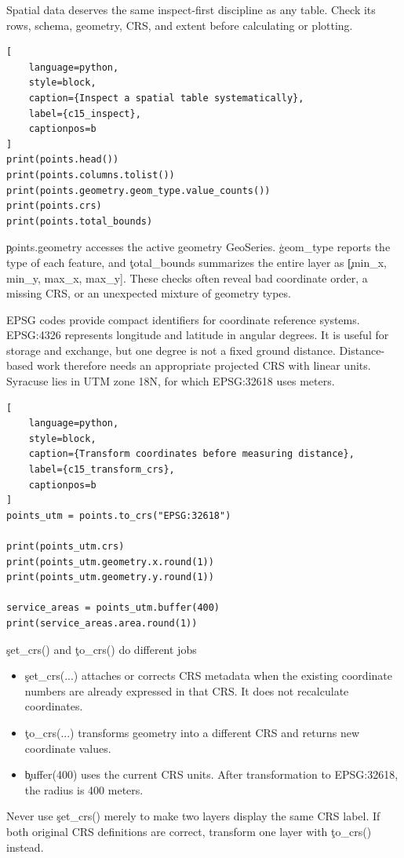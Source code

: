 
Spatial data deserves the same inspect-first discipline as any table. Check
its rows, schema, geometry, CRS, and extent before calculating or plotting.

\begin{lstlisting}[
    language=python,
    style=block,
    caption={Inspect a spatial table systematically},
    label={c15_inspect},
    captionpos=b
]
print(points.head())
print(points.columns.tolist())
print(points.geometry.geom_type.value_counts())
print(points.crs)
print(points.total_bounds)
\end{lstlisting}

\c{points.geometry} accesses the active geometry GeoSeries.
\c{geom_type} reports the type of each feature, and \c{total_bounds} summarizes
the entire layer as \c{[min_x, min_y, max_x, max_y]}. These checks often reveal
bad coordinate order, a missing CRS, or an unexpected mixture of geometry types.


EPSG codes provide compact identifiers for coordinate reference systems.
EPSG:4326 represents longitude and latitude in angular degrees. It is useful
for storage and exchange, but one degree is not a fixed ground distance.
Distance-based work therefore needs an appropriate projected CRS with linear
units. Syracuse lies in UTM zone 18N, for which EPSG:32618 uses meters.

\begin{lstlisting}[
    language=python,
    style=block,
    caption={Transform coordinates before measuring distance},
    label={c15_transform_crs},
    captionpos=b
]
points_utm = points.to_crs("EPSG:32618")

print(points_utm.crs)
print(points_utm.geometry.x.round(1))
print(points_utm.geometry.y.round(1))

service_areas = points_utm.buffer(400)
print(service_areas.area.round(1))
\end{lstlisting}

\begin{SyntaxBox}{\c{set_crs()} and \c{to_crs()} do different jobs}
\begin{itemize}
    \item \c{set_crs(...)} attaches or corrects CRS metadata when the existing
          coordinate numbers are already expressed in that CRS. It does not
          recalculate coordinates.
    \item \c{to_crs(...)} transforms geometry into a different CRS and returns
          new coordinate values.
    \item \c{buffer(400)} uses the current CRS units. After transformation to
          EPSG:32618, the radius is 400 meters.
\end{itemize}
Never use \c{set_crs()} merely to make two layers display the same CRS label.
If both original CRS definitions are correct, transform one layer with
\c{to_crs()} instead.
\end{SyntaxBox}

